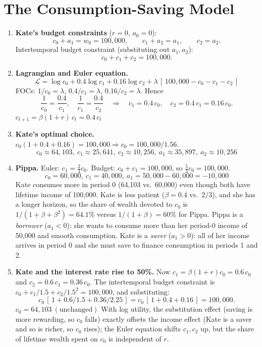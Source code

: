 \documentclass[11pt]{article}
\newcommand{\ans}[1]{$\boxed{#1}$}
\begin{document}
\section{The Consumption-Saving Model}

\begin{enumerate}[label=\textbf{\arabic*.}, leftmargin=*]

\item \textbf{Kate's budget constraints} ($r=0$, $a_0=0$):
\[
  c_0 + a_1 = w_0 = 100{,}000, \qquad c_1 + a_2 = a_1, \qquad c_2 = a_2 .
\]
Intertemporal budget constraint (substituting out $a_1, a_2$):
\[
  c_0 + c_1 + c_2 = 100{,}000 .
\]

\item \textbf{Lagrangian and Euler equation.}
\[
  \mathcal L = \log c_0 + 0.4\log c_1 + 0.16\log c_2 + \lambda\,[\,100{,}000 - c_0 - c_1 - c_2\,]
\]
FOCs: $1/c_0 = \lambda$, $0.4/c_1 = \lambda$, $0.16/c_2=\lambda$. Hence
\[
  \frac{1}{c_0} = \frac{0.4}{c_1}, \quad \frac{1}{c_1} = \frac{0.4}{c_2}
  \quad\Longrightarrow\quad c_1 = 0.4\,c_0, \quad c_2 = 0.4\,c_1 = 0.16\,c_0 .
\]
\ans{c_{t+1} = \beta(1+r)\,c_t = 0.4\,c_t}

\item \textbf{Kate's optimal choice.}
$c_0(1+0.4+0.16) = 100{,}000 \Rightarrow c_0 = 100{,}000/1.56$.
\[
  \boxed{c_0 \approx 64{,}103,\ c_1 \approx 25{,}641,\ c_2 \approx 10{,}256,\ a_1 \approx 35{,}897,\ a_2 \approx 10{,}256}
\]

\item \textbf{Pippa.} Euler: $c_1 = \tfrac23 c_0$. Budget: $c_0+c_1 = 100{,}000$, so $\tfrac53 c_0 = 100{,}000$.
\[
  \boxed{c_0 = 60{,}000,\ c_1 = 40{,}000,\ a_1 = 50{,}000 - 60{,}000 = -10{,}000}
\]
Kate consumes more in period 0 (64,103 vs.\ 60,000) even though both have lifetime income of 100,000. Kate is less patient ($\beta=0.4$ vs.\ $2/3$), and she has a longer horizon, so the share of wealth devoted to $c_0$ is $1/(1+\beta+\beta^2) = 64.1\%$ versus $1/(1+\beta) = 60\%$ for Pippa. Pippa is a \emph{borrower} ($a_1<0$): she wants to consume more than her period-0 income of 50,000 and smooth consumption. Kate is a \emph{saver} ($a_1>0$): all of her income arrives in period 0 and she must save to finance consumption in periods 1 and 2.

\item \textbf{Kate and the interest rate rise to 50\%.}
Now $c_1 = \beta(1+r)c_0 = 0.6\,c_0$ and $c_2 = 0.6\,c_1 = 0.36\,c_0$. The intertemporal budget constraint is $c_0 + c_1/1.5 + c_2/1.5^2 = 100{,}000$, and substituting:
\[
  c_0\,[\,1 + 0.6/1.5 + 0.36/2.25\,] = c_0\,[\,1+0.4+0.16\,] = 100{,}000 .
\]
\ans{c_0 = 64{,}103 \ (\text{unchanged})}
With log utility, the substitution effect (saving is more rewarding, so $c_0$ falls) exactly offsets the income effect (Kate is a saver and so is richer, so $c_0$ rises); the Euler equation shifts $c_1,c_2$ up, but the share of lifetime wealth spent on $c_0$ is independent of $r$.


\end{enumerate}
\end{document}
